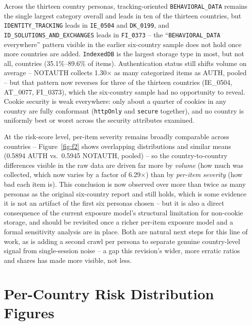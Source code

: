 \documentclass[11pt,a4paper]{article}
\newcommand{\code}[1]{\texttt{#1}}
\begin{document}
Across the thirteen country personas, tracking-oriented \code{BEHAVIORAL\_DATA}
remains the single largest category overall and leads in ten of the thirteen
countries, but \code{IDENTITY\_TRACKING} leads in \code{IE\_0504} and
\code{DK\_0199}, and \code{ID\_SOLUTIONS\_AND\_EXCHANGES} leads in
\code{FI\_0373} -- the ``\code{BEHAVIORAL\_DATA} everywhere'' pattern visible in
the earlier six-country sample does not hold once more countries are added.
\code{IndexedDB} is the largest storage type in most, but not all, countries
(35.1\%--89.6\% of items). Authentication status still shifts
volume on average -- NOTAUTH collects 1.30$\times$ as many
categorized items as AUTH, pooled -- but that pattern now reverses for three
of the thirteen countries (IE\_0504, AT\_0077, FI\_0373), which the six-country sample had
no opportunity to reveal. Cookie security is weak everywhere: only about a
quarter of cookies in any country are fully conformant (\code{httpOnly} and
\code{secure} together), and no country is uniformly best or worst across the
security attributes examined.

At the risk-score level, per-item severity remains broadly comparable across
countries -- Figure~\ref{fig:f2} shows overlapping distributions and similar
means (0.5894 AUTH vs.\ 0.5945 NOTAUTH, pooled) -- so the
country-to-country differences visible in the raw data are driven far more by
\emph{volume} (how much was collected, which now varies by a factor of
6.29$\times$) than by \emph{per-item severity} (how bad each item
is). This conclusion is now observed over more than twice as many personas as
the original six-country report and still holds, which is some evidence it is
not an artifact of the first six personas chosen -- but it is also a direct
consequence of the current exposure model's structural limitation for
non-cookie storage, and should be revisited once a richer per-item exposure
model and a formal sensitivity analysis are in place. Both are natural next
steps for this line of work, as is adding a second crawl per persona to
separate genuine country-level signal from single-session noise -- a gap this
revision's wider, more erratic ratios and shares has made more visible, not
less.

\appendix

\section{Per-Country Risk Distribution Figures}
\label{app:f1}
\end{document}

